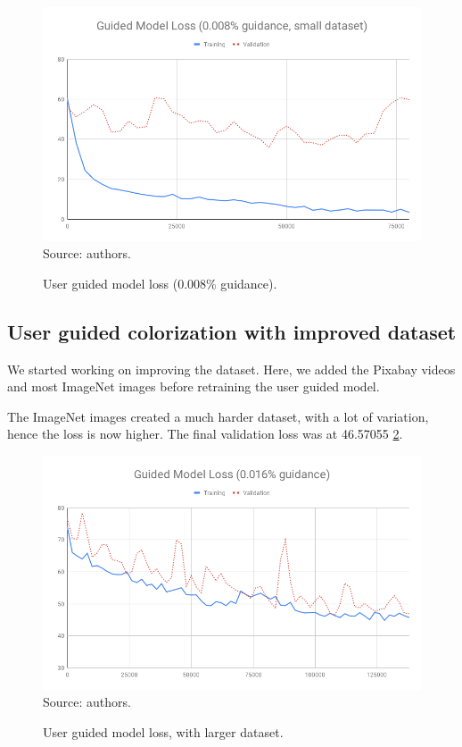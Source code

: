 \documentclass[12pt,openright,oneside,a4paper,english, brazilian]{abntex2}
\begin{document}
\begin{otherlanguage}{english}
\begin{figure}[!htb]
\centering
\caption{User guided model loss (0.008\% guidance).}
\includegraphics[width=\textwidth]{loss/Guided_0_008}
Source: authors.
\label{loss_0_008}
\end{figure}

\subsection{User guided colorization with improved dataset}

We started working on improving the dataset. Here, we added the Pixabay videos and most ImageNet images before retraining the user guided model.

The ImageNet images created a much harder dataset, with a lot of variation, hence the loss is now higher. The final validation loss was at 46.57055 \ref{loss_0_016}.

\begin{figure}[!htb]
\centering
\caption{User guided model loss, with larger dataset.}
\includegraphics[width=\textwidth]{loss/Guided_0_016}
Source: authors.
\label{loss_0_016}
\end{figure}


\end{otherlanguage}
\end{document}
